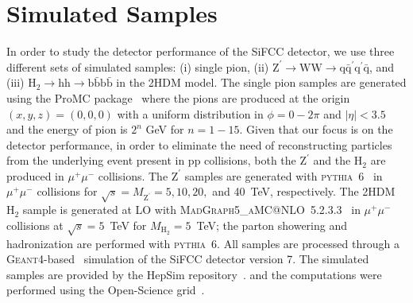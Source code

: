 \documentclass{PoS}
\makeatletter
\newcommand{\PYTHIA} {{\textsc{pythia}}}
\newcommand{\GEANTfour} {{\textsc{Geant4}}}
\newcommand{\MADGRAPHAMC} {\textsc{MadGraph5\_aMC@NLO}}
\makeatother
\begin{document}
\section{Simulated Samples \label{sec:sample}}
In order to study the detector performance of the SiFCC detector, we use 
three different sets of simulated samples: (i) single pion, (ii) 
$\mathrm{Z}^{\prime}\rightarrow \mathrm{WW} \rightarrow \mathrm{q}\bar{\mathrm{q}}^\prime\mathrm{q^\prime}\bar{\mathrm{q}}$, and (iii) 
$\mathrm{H}_2\rightarrow \mathrm{hh} \rightarrow \mathrm{b}\bar{\mathrm{b}} \mathrm{b}\bar{\mathrm{b}}$ in the 2HDM model. 
% 
The single pion samples are generated using the ProMC 
package~\cite{PROMC} where the pions are 
produced at the origin $(x,y,z)=(0,0,0)$ with a uniform distribution 
in $\phi=0-2\pi$ and $\left|\eta\right| < 3.5$ and the energy of pion is 
$2^n$ GeV for $n=1-15$. 
%
Given that our focus is on the detector performance, in order to eliminate 
the need of reconstructing particles from the underlying event present in pp 
collisions, 
both the $\mathrm{Z}^{\prime}$ and the $\mathrm{H}_2$ are produced in 
$\mu^+\mu^-$ collisions. 
The $\mathrm{Z}^{\prime}$ samples are generated with 
\PYTHIA~6~\cite{PYTHIA} in $\mu^+\mu^-$ collisions for 
$\sqrt{s}=M_\mathrm{Z^\prime}=5,10,20,$ and 40~TeV, respectively. 
The 2HDM $\mathrm{H}_2$ sample is generated at LO with 
\MADGRAPHAMC~5.2.3.3~\cite{MADGRAPH} in $\mu^+\mu^-$ collisions at 
$\sqrt{s}=5$~TeV for $M_\mathrm{H_2}=5$~TeV; the parton showering and 
hadronization are performed with \PYTHIA~6. 
%
All samples are processed through a \GEANTfour-based~\cite{GEANT4} simulation 
of the SiFCC detector version 7. 
The simulated samples are provided by the HepSim repository~\cite{hepsim}. 
and the computations were performed using the Open-Science grid~\cite{osg}. 

\end{document}
